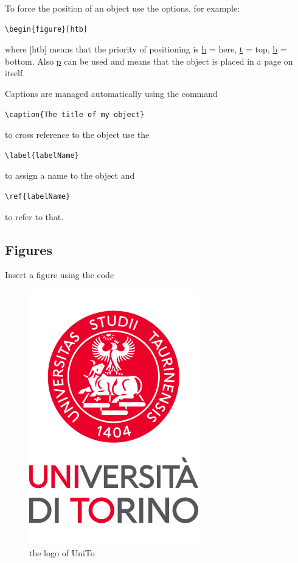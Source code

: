 To force the position of an object use the options, for example:
\begin{verbatim}
\begin{figure}[htb]
\end{verbatim}
where [htb] means that the priority of positioning is \url{h} = here, \url{t} = top, \url{b} = bottom. Also \url{p} can be used and means that the object is placed in a page on itself.

Captions are managed automatically using the command
\begin{verbatim}
\caption{The title of my object}
\end{verbatim}
to cross reference to the object use the
\begin{verbatim} 
\label{labelName} 
\end{verbatim}
to assign a name to the object and
\begin{verbatim} 
\ref{labelName}
\end{verbatim}
to refer to that.



\subsection{Figures}

Insert a figure using the code
\begin{figure}[htb]
\centering
\includegraphics[scale=0.15]{pictures/logo}
\caption{the logo of UniTo}
\label{fig:myfigure}
\end{figure}



